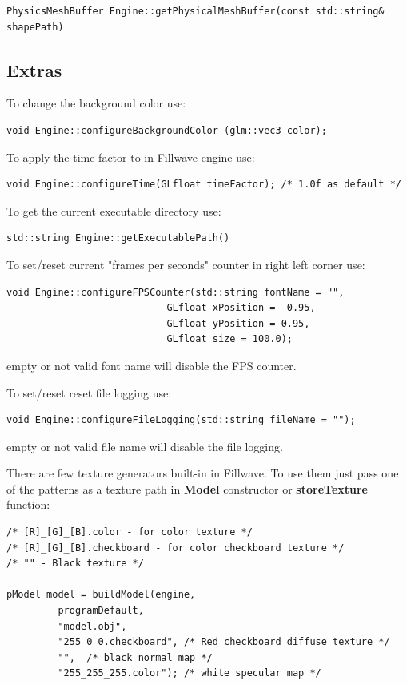 \documentclass{article}
\begin{document}
\begin{lstlisting}
PhysicsMeshBuffer Engine::getPhysicalMeshBuffer(const std::string& shapePath)
\end{lstlisting}

\subsection{Extras}\label{sec:Extras}
\indent To change the background color use:

\begin{lstlisting}
void Engine::configureBackgroundColor (glm::vec3 color);
\end{lstlisting}

\indent To apply the time factor to in Fillwave engine use:

\begin{lstlisting}
void Engine::configureTime(GLfloat timeFactor); /* 1.0f as default */
\end{lstlisting}

\indent To get the current executable directory use:

\begin{lstlisting}
std::string Engine::getExecutablePath()
\end{lstlisting}

\indent To set/reset current "frames per seconds" counter in right left corner use:

\begin{lstlisting}
void Engine::configureFPSCounter(std::string fontName = "",
                            GLfloat xPosition = -0.95,
                            GLfloat yPosition = 0.95,
                            GLfloat size = 100.0);
\end{lstlisting}

empty or not valid font name will disable the FPS counter.

\indent To set/reset reset file logging use:

\begin{lstlisting}
void Engine::configureFileLogging(std::string fileName = "");
\end{lstlisting}

empty or not valid file name will disable the file logging.

\indent There are few texture generators built-in in Fillwave. To use them just pass one of the patterns as a texture path in \textbf{Model} constructor or \textbf{storeTexture} function:
\begin{lstlisting}
/* [R]_[G]_[B].color - for color texture */
/* [R]_[G]_[B].checkboard - for color checkboard texture */
/* "" - Black texture */

pModel model = buildModel(engine,
         programDefault,
         "model.obj",
         "255_0_0.checkboard", /* Red checkboard diffuse texture */
         "",  /* black normal map */
         "255_255_255.color"); /* white specular map */
\end{lstlisting}
\end{document}
